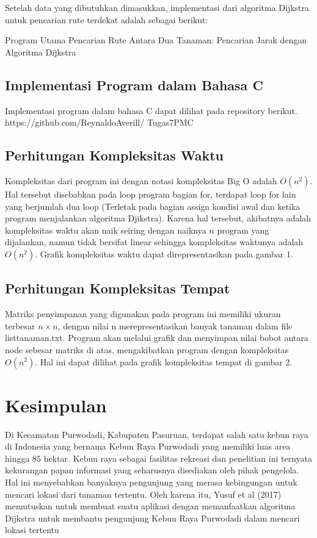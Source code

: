 \documentclass[conference]{IEEEtran}
\begin{document}
Setelah data yang dibutuhkan dimasukkan, implementasi
dari algoritma Dijkstra untuk pencarian rute terdekat adalah
sebagai berikut:

\begin{algorithm}
	\caption {Program Utama Pencarian Rute Antara
			Dua Tanaman: Pencarian Jarak dengan Algoritma Dijkstra}
	\SetAlgoLined
	\DontPrintSemicolon

\end{algorithm}

\subsection{Implementasi Program dalam Bahasa C}
Implementasi program dalam bahasa C dapat dilihat
pada repository berikut. https://github.com/ReynaldoAverill/
Tugas7PMC

\subsection{Perhitungan Kompleksitas Waktu}
Kompleksitas dari program ini dengan notasi kompleksitas
Big O adalah $O(n^2)$. Hal tersebut disebabkan pada loop
program bagian for, terdapat loop for lain yang berjumlah
dua loop (Terletak pada bagian assign kondisi awal dan ketika
program menjalankan algoritma Djikstra). Karena hal tersebut,
akibatnya adalah kompleksitas waktu akan naik seiring dengan
naiknya $n$ program yang dijalankan, namun tidak bersifat
linear sehingga kompleksitas waktunya adalah $O(n^2)$. Grafik
kompleksitas waktu dapat direpresentasikan pada gambar 1.

\subsection{Perhitungan Kompleksitas Tempat}
Matriks penyimpanan yang digunakan pada program ini
memiliki ukuran terbesar $n \times n$, dengan nilai n merepresentasikan
banyak tanaman dalam file listtanaman.txt. Program
akan melalui grafik dan menyimpan nilai bobot antara node
sebesar matriks di atas, mengakibatkan program dengan kompleksitas
$O(n^2)$. Hal ini dapat dilihat pada grafik kompleksitas
tempat di gambar 2.

\section{Kesimpulan}
Di Kecamatan Purwodadi, Kabupaten Pasuruan, terdapat salah satu kebun raya di Indonesia yang bernama Kebun Raya Purwodadi yang memiliki luas area hingga 85 hektar. Kebun raya sebagai fasilitas rekreasi dan penelitian ini ternyata kekurangan papan informasi yang seharusnya disediakan oleh pihak pengelola. Hal ini menyebabkan banyaknya pengunjung yang merasa kebingungan untuk mencari lokasi dari tanaman tertentu. Oleh karena itu, Yusuf et al (2017) memutuskan untuk membuat suatu aplikasi dengan memanfaatkan algoritma Dijkstra untuk membantu pengunjung Kebun Raya Purwodadi dalam mencari lokasi tertentu





\end{document}
